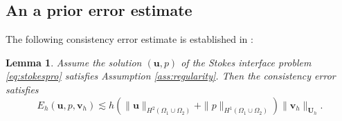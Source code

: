 \documentclass[a4paper,11pt,fleqn]{article}
\newtheorem{lemma}[theorem]{Lemma}
\numberwithin{equation}{section}
\begin{document}
\subsection{An a prior error estimate}\label{subsec:prior}
The following consistency error estimate is established in \cite{Wang2025nonconforming}:
\begin{lemma}\label{le:consistency}
	Assume the solution $(\bm{u}, p)$ of the Stokes interface problem \eqref{eq:stokespro} satisfies Assumption \ref{ass:regularity}. Then the consistency error satisfies
	\begin{equation}
		E_h(\bm{u}, p,\bm{v}_h) \lesssim h (\|\bm{u}\|_{H^2(\Omega_1 \cup \Omega_2)} + \|p\|_{H^1(\Omega_1 \cup \Omega_2)}) \|\bm{v}_h\|_{\bm{U}_h}.
	\end{equation}
\end{lemma}
\end{document}

